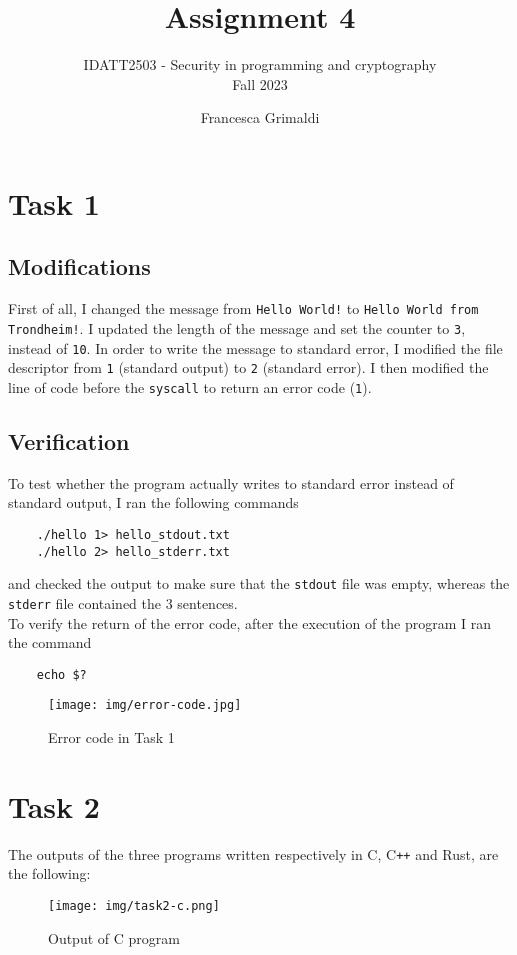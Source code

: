 \documentclass{article}
\title{%
    \huge Assignment 4}
\subtitle{%
    IDATT2503 - Security in programming and cryptography \\
    Fall 2023 \\
    }
\author{%
  Francesca Grimaldi\\
}
\date{}
\begin{document}
\maketitle


\section{Task 1}

\subsection{Modifications}

First of all, I changed the message from \texttt{Hello World!} to \texttt{Hello World from Trondheim!}. I updated the length of the message and set the counter to \texttt{3}, instead of \texttt{10}.
In order to write the message to standard error, I modified the file descriptor from \texttt{1} (standard output) to \texttt{2} (standard error).
I then modified the line of code before the \texttt{syscall} to return an error code (\texttt{1}).

\subsection{Verification}
To test whether the program actually writes to standard error instead of standard output, I ran the following commands
\begin{verbatim}
    ./hello 1> hello_stdout.txt
    ./hello 2> hello_stderr.txt
\end{verbatim}
and checked the output to make sure that the \texttt{stdout} file was empty, whereas the \texttt{stderr} file contained the 3 sentences.\\
To verify the return of the error code, after the execution of the program I ran the command
\begin{verbatim}
    echo $?
\end{verbatim}

\begin{figure}[H]
    \centering
    \texttt{[image: img/error-code.jpg]}
    \caption{Error code in Task 1}
    \label{fig:Error code}
\end{figure}

\section{Task 2}
The outputs of the three programs written respectively in C, C\texttt{++} and Rust, are the following:
\begin{figure}[H]
    \centering
    \texttt{[image: img/task2-c.png]}
    \caption{Output of C program}
    \label{fig:Task 2 C}
\end{figure}
\end{document}
